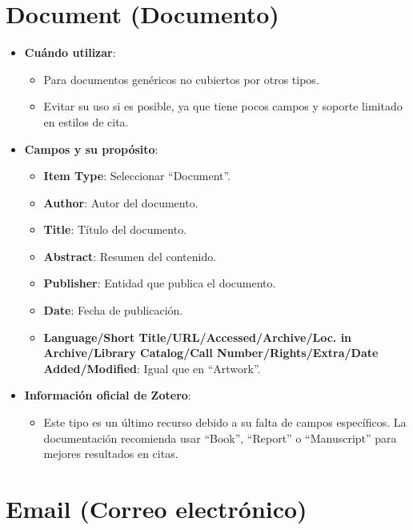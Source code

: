 \documentclass[
  jou,
  floatsintext,
  longtable,
  a4paper,
  nolmodern,
  notxfonts,
  notimes,
  12pt,
  colorlinks=true,linkcolor=blue,citecolor=blue,urlcolor=blue]{apa7}
\providecommand{\tightlist}{%
  \setlength{\itemsep}{0pt}\setlength{\parskip}{0pt}}
\begin{document}
\section{Document (Documento)}\label{document-documento}

\begin{itemize}
\tightlist
\item
  \textbf{Cuándo utilizar}:

  \begin{itemize}
  \tightlist
  \item
    Para documentos genéricos no cubiertos por otros tipos.
  \item
    Evitar su uso si es posible, ya que tiene pocos campos y soporte
    limitado en estilos de cita.
  \end{itemize}
\item
  \textbf{Campos y su propósito}:

  \begin{itemize}
  \tightlist
  \item
    \textbf{Item Type}: Seleccionar ``Document''.
  \item
    \textbf{Author}: Autor del documento.
  \item
    \textbf{Title}: Título del documento.
  \item
    \textbf{Abstract}: Resumen del contenido.
  \item
    \textbf{Publisher}: Entidad que publica el documento.
  \item
    \textbf{Date}: Fecha de publicación.
  \item
    \textbf{Language/Short Title/URL/Accessed/Archive/Loc. in
    Archive/Library Catalog/Call Number/Rights/Extra/Date
    Added/Modified}: Igual que en ``Artwork''.
  \end{itemize}
\item
  \textbf{Información oficial de Zotero}:

  \begin{itemize}
  \tightlist
  \item
    Este tipo es un último recurso debido a su falta de campos
    específicos. La documentación recomienda usar ``Book'', ``Report'' o
    ``Manuscript'' para mejores resultados en citas.
  \end{itemize}
\end{itemize}

\section{Email (Correo electrónico)}\label{email-correo-electruxf3nico}
\end{document}
